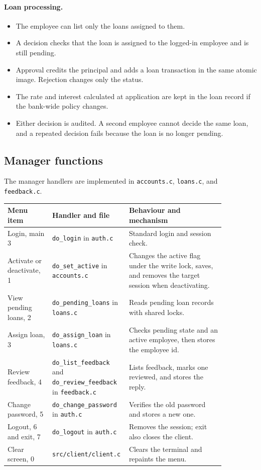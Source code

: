 \documentclass[11pt,a4paper]{article}
\begin{document}
\paragraph{Loan processing.}
\begin{itemize}
\item The employee can list only the loans assigned to them.
\item A decision checks that the loan is assigned to the logged-in employee and is still pending.
\item Approval credits the principal and adds a loan transaction in the same atomic image. Rejection changes only the status.
\item The rate and interest calculated at application are kept in the loan record if the bank-wide policy changes.
\item Either decision is audited. A second employee cannot decide the same loan, and a repeated decision fails because the loan is no longer pending.
\end{itemize}

\subsection{Manager functions}

The manager handlers are implemented in \texttt{accounts.c}, \texttt{loans.c}, and \texttt{feedback.c}.

\begin{longtable}{L{0.20\linewidth}L{0.23\linewidth}L{0.43\linewidth}}
\hline
Menu item & Handler and file & Behaviour and mechanism \\
\hline
\endhead
Login, main 3 & \texttt{do\_login} in \texttt{auth.c} & Standard login and session check. \\
Activate or deactivate, 1 & \texttt{do\_set\_active} in \texttt{accounts.c} & Changes the active flag under the write lock, saves, and removes the target session when deactivating. \\
View pending loans, 2 & \texttt{do\_pending\_loans} in \texttt{loans.c} & Reads pending loan records with shared locks. \\
Assign loan, 3 & \texttt{do\_assign\_loan} in \texttt{loans.c} & Checks pending state and an active employee, then stores the employee id. \\
Review feedback, 4 & \texttt{do\_list\_feedback} and \texttt{do\_review\_feedback} in \texttt{feedback.c} & Lists feedback, marks one reviewed, and stores the reply. \\
Change password, 5 & \texttt{do\_change\_password} in \texttt{auth.c} & Verifies the old password and stores a new one. \\
Logout, 6 and exit, 7 & \texttt{do\_logout} in \texttt{auth.c} & Removes the session; exit also closes the client. \\
Clear screen, 0 & \texttt{src/client/client.c} & Clears the terminal and repaints the menu. \\
\hline
\end{longtable}
\end{document}
